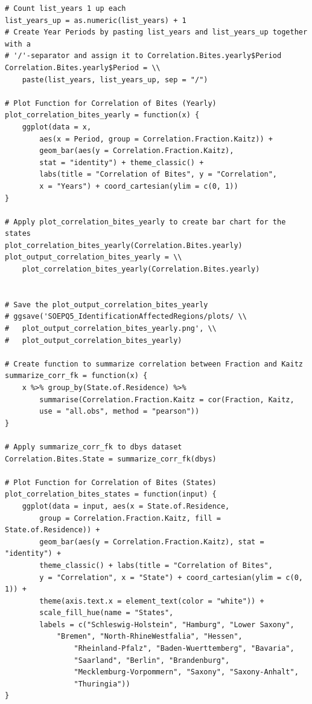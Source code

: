 \documentclass[a4paper]{article}
\begin{document}
{\begin{lstlisting}
# Count list_years 1 up each
list_years_up = as.numeric(list_years) + 1
# Create Year Periods by pasting list_years and list_years_up together with a 
# '/'-separator and assign it to Correlation.Bites.yearly$Period
Correlation.Bites.yearly$Period = \\
	paste(list_years, list_years_up, sep = "/")

# Plot Function for Correlation of Bites (Yearly)
plot_correlation_bites_yearly = function(x) {
    ggplot(data = x, 
    	aes(x = Period, group = Correlation.Fraction.Kaitz)) + 
        geom_bar(aes(y = Correlation.Fraction.Kaitz), 
        stat = "identity") + theme_classic() +
        labs(title = "Correlation of Bites", y = "Correlation", 
        x = "Years") + coord_cartesian(ylim = c(0, 1))
}

# Apply plot_correlation_bites_yearly to create bar chart for the states
plot_correlation_bites_yearly(Correlation.Bites.yearly)
plot_output_correlation_bites_yearly = \\
	plot_correlation_bites_yearly(Correlation.Bites.yearly)


# Save the plot_output_correlation_bites_yearly
# ggsave('SOEPQ5_IdentificationAffectedRegions/plots/ \\
#	plot_output_correlation_bites_yearly.png', \\
#	plot_output_correlation_bites_yearly)

# Create function to summarize correlation between Fraction and Kaitz
summarize_corr_fk = function(x) {
    x %>% group_by(State.of.Residence) %>% 
    	summarise(Correlation.Fraction.Kaitz = cor(Fraction, Kaitz, 
        use = "all.obs", method = "pearson"))
}

# Apply summarize_corr_fk to dbys dataset
Correlation.Bites.State = summarize_corr_fk(dbys)

# Plot Function for Correlation of Bites (States)
plot_correlation_bites_states = function(input) {
    ggplot(data = input, aes(x = State.of.Residence, 
    	group = Correlation.Fraction.Kaitz, fill = State.of.Residence)) + 
        geom_bar(aes(y = Correlation.Fraction.Kaitz), stat = "identity") + 
        theme_classic() + labs(title = "Correlation of Bites", 
        y = "Correlation", x = "State") + coord_cartesian(ylim = c(0, 1)) + 
        theme(axis.text.x = element_text(color = "white")) + 
        scale_fill_hue(name = "States", 
        labels = c("Schleswig-Holstein", "Hamburg", "Lower Saxony", 
        	"Bremen", "North-RhineWestfalia", "Hessen", 
            	"Rheinland-Pfalz", "Baden-Wuerttemberg", "Bavaria", 
            	"Saarland", "Berlin", "Brandenburg", 
            	"Mecklemburg-Vorpommern", "Saxony", "Saxony-Anhalt", 
                "Thuringia"))
}


\end{lstlisting}}
\end{document}
